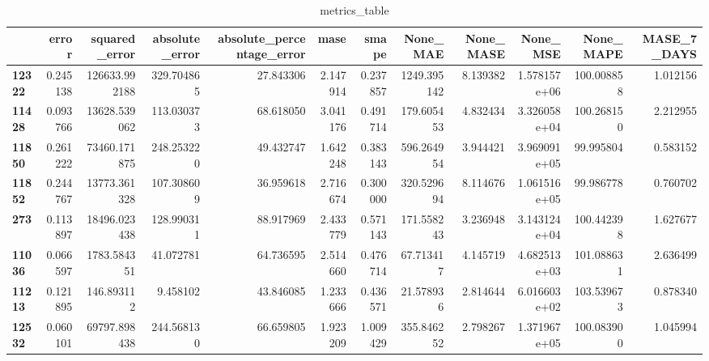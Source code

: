 \begin{table}[h]
\centering
\caption{metrics_table}
\label{table:Final tune for dataset seasonal lstm local univariate. After smape fix}
\begin{tabular}{lrrrrrrrrrrr}
\toprule
{} &     error &  squared\_error &  absolute\_error &  absolute\_percentage\_error &      mase &     smape &     None\_MAE &  None\_MASE &      None\_MSE &   None\_MAPE &  MASE\_7\_DAYS \\
\midrule
\textbf{12322} &  0.245138 &  126633.992188 &      329.704865 &                  27.843306 &  2.147914 &  0.237857 &  1249.395142 &   8.139382 &  1.578157e+06 &  100.008858 &     1.012156 \\
\textbf{11428} &  0.093766 &   13628.539062 &      113.030373 &                  68.618050 &  3.041176 &  0.491714 &   179.605453 &   4.832434 &  3.326058e+04 &  100.268150 &     2.212955 \\
\textbf{11850} &  0.261222 &   73460.171875 &      248.253220 &                  49.432747 &  1.642248 &  0.383143 &   596.264954 &   3.944421 &  3.969091e+05 &   99.995804 &     0.583152 \\
\textbf{11852} &  0.244767 &   13773.361328 &      107.308609 &                  36.959618 &  2.716674 &  0.300000 &   320.529694 &   8.114676 &  1.061516e+05 &   99.986778 &     0.760702 \\
\textbf{273  } &  0.113897 &   18496.023438 &      128.990311 &                  88.917969 &  2.433779 &  0.571143 &   171.558243 &   3.236948 &  3.143124e+04 &  100.442398 &     1.627677 \\
\textbf{11036} &  0.066597 &    1783.584351 &       41.072781 &                  64.736595 &  2.514660 &  0.476714 &    67.713417 &   4.145719 &  4.682513e+03 &  101.088631 &     2.636499 \\
\textbf{11213} &  0.121895 &     146.893112 &        9.458102 &                  43.846085 &  1.233666 &  0.436571 &    21.578936 &   2.814644 &  6.016603e+02 &  103.539673 &     0.878340 \\
\textbf{12532} &  0.060101 &   69797.898438 &      244.568130 &                  66.659805 &  1.923209 &  1.009429 &   355.846252 &   2.798267 &  1.371967e+05 &  100.083900 &     1.045994 \\
\bottomrule
\end{tabular}
\end{table}
